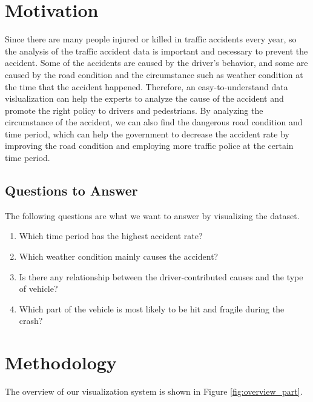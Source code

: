 \documentclass[a4paper, oneside, final, 12pt]{scrartcl} %
\begin{document}
\section{Motivation}

Since there are many people injured or killed in traffic accidents every year,
so the analysis of the traffic accident data 
is important and necessary to prevent the accident.
Some of the accidents are caused by the driver's behavior,
and some are caused by the road condition 
and the circumstance such as weather condition at the time that the accident happened.
Therefore, an easy-to-understand data vislualization 
can help the experts to analyze the cause of the accident
and promote the right policy to drivers and pedestrians.
By analyzing the circumstance of the accident,
we can also find the dangerous road condition and time period,
which can help the government to decrease the accident rate 
by improving the road condition and employing more traffic police at the certain time period.

\subsection{Questions to Answer}

The following questions are what we want to answer by visualizing the dataset.

\begin{enumerate}
  \item Which time period has the highest accident rate?
  \item Which weather condition mainly causes the accident?
  \item Is there any relationship between the 
  driver-contributed causes and the type of vehicle?
  \item Which part of the vehicle is most likely to be hit and fragile during the crash?
\end{enumerate}

\section{Methodology}

The overview of our visualization system is shown in Figure \ref{fig:overview_part}.
\end{document}
